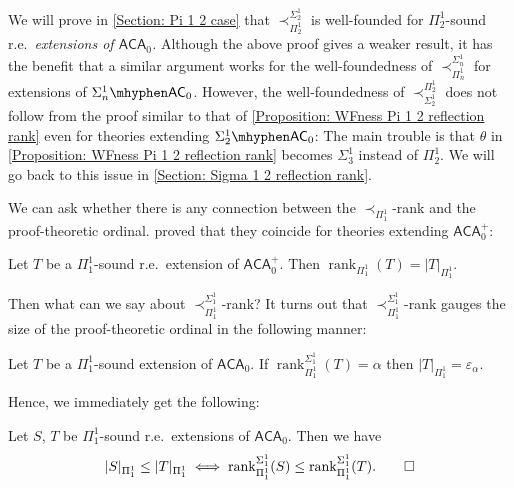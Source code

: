 \documentclass{mhkr}
\newcommand{\rank}{\operatorname{rank}}
\newcommand{\AC}{\mathsf{AC}}
\newcommand{\ACA}{\mathsf{ACA}}
\begin{document}
We will prove in \autoref{Section: Pi 1 2 case} that $\prec^{\Sigma^1_2}_{\Pi^1_2}$ is well-founded for $\Pi^1_2$-sound r.e.\ \emph{extensions of $\ACA_0$.} Although the above proof gives a weaker result, it has the benefit that a similar argument works for the well-foundedness of $\prec^{\Sigma^1_n}_{\Pi^1_n}$ for extensions of $\Sigma^1_n\mhyphen\AC_0$. 
However, the well-foundedness of $\prec^{\Pi^1_2}_{\Sigma^1_2}$ does not follow from the proof similar to that of \autoref{Proposition: WFness Pi 1 2 reflection rank} even for theories extending $\Sigma^1_2\mhyphen\AC_0$: The main trouble is that $\theta$ in \autoref{Proposition: WFness Pi 1 2 reflection rank} becomes $\Sigma^1_3$ instead of $\Pi^1_2$. We will go back to this issue in \autoref{Section: Sigma 1 2 reflection rank}.

We can ask whether there is any connection between the $\prec_{\Pi^1_1}$-rank and the proof-theoretic ordinal. \cite{PakhomovWalsh2021ReflectionInfDeriv} proved that they coincide for theories extending $\ACA_0^+$:
\begin{theorem}
    Let $T$ be a $\Pi^1_1$-sound r.e.\ extension of $\ACA_0^+$. Then $\rank_{\Pi^1_1}(T) = |T|_{\Pi^1_1}$.
\end{theorem}

Then what can we say about $\prec^{\Sigma^1_1}_{\Pi^1_1}$-rank?
It turns out that  $\prec^{\Sigma^1_1}_{\Pi^1_1}$-rank gauges the size of the proof-theoretic ordinal in the following manner:
\begin{theorem}
    Let $T$ be a $\Pi^1_1$-sound extension of $\ACA_0$. If $\rank^{\Sigma^1_1}_{\Pi^1_1}(T)=\alpha$ then $|T|_{\Pi^1_1}=\varepsilon_\alpha$.
\end{theorem}

Hence, we immediately get the following:
\begin{theorem} \label{Theorem: Proof theoretic ordinal and Pi 1 1 rank equivalence} \pushQED{\qed }
    Let $S$, $T$ be $\Pi^1_1$-sound r.e.\ extensions of $\ACA_0$. Then we have
    \begin{equation*}
        |S|_{\Pi^1_1} \le |T|_{\Pi^1_1} \iff \rank^{\Sigma^1_1}_{\Pi^1_1}(S)\le \rank^{\Sigma^1_1}_{\Pi^1_1}(T). \qedhere 
    \end{equation*}
\end{theorem}
\end{document}
